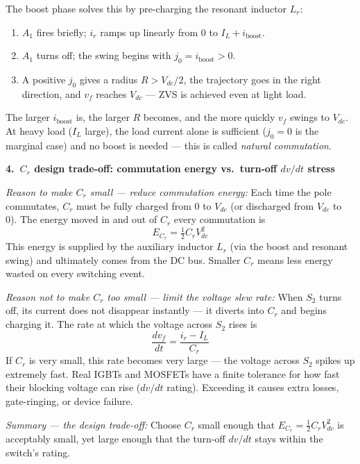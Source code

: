 \documentclass[12pt, a4paper]{article}
\newcommand{\Vdc}{V_{dc}}
\newcommand{\vf}{v_f}
\newcommand{\ir}{i_r}
\newcommand{\IL}{I_L}
\newcommand{\Lr}{L_r}
\newcommand{\Cr}{C_r}
\begin{document}
\begin{physbox}
The boost phase solves this by pre-charging the resonant inductor $\Lr$:
\begin{enumerate}
    \item $A_1$ fires briefly; $\ir$ ramps up linearly from 0 to
          $\IL + i_\text{boost}$.
    \item $A_1$ turns off; the swing begins with
          $j_0 = i_\text{boost} > 0$.
    \item A positive $j_0$ gives a radius $R > \Vdc/2$, the trajectory
          goes in the right direction, and $\vf$ reaches $\Vdc$ — ZVS
          is achieved even at light load.
\end{enumerate}
The larger $i_\text{boost}$ is, the larger $R$ becomes, and the more
quickly $\vf$ swings to $\Vdc$.  At heavy load ($\IL$ large), the load
current alone is sufficient ($j_0 = 0$ is the marginal case) and no
boost is needed — this is called \emph{natural commutation}.

\medskip
\textbf{4.\ $\Cr$ design trade-off: commutation energy vs.\ turn-off $dv/dt$ stress}

\textit{Reason to make $\Cr$ small — reduce commutation energy:}
Each time the pole commutates, $\Cr$ must be fully charged from 0 to
$\Vdc$ (or discharged from $\Vdc$ to 0).
The energy moved in and out of $\Cr$ every commutation is
\begin{equation*}
    E_{\Cr} = \tfrac{1}{2}\Cr\Vdc^2
\end{equation*}
This energy is supplied by the auxiliary inductor $\Lr$ (via the boost
and resonant swing) and ultimately comes from the DC bus.
Smaller $\Cr$ means less energy wasted on every switching event.

\textit{Reason not to make $\Cr$ too small — limit the voltage slew rate:}
When $S_2$ turns off, its current does not disappear instantly — it
diverts into $\Cr$ and begins charging it.
The rate at which the voltage across $S_2$ rises is
\begin{equation*}
    \frac{d\vf}{dt} = \frac{\ir - \IL}{\Cr}
\end{equation*}
If $\Cr$ is very small, this rate becomes very large — the voltage
across $S_2$ spikes up extremely fast.
Real IGBTs and MOSFETs have a finite tolerance for how fast their
blocking voltage can rise ($dv/dt$ rating).
Exceeding it causes extra losses, gate-ringing, or device failure.

\textit{Summary — the design trade-off:}
Choose $\Cr$ small enough that $E_{\Cr} = \frac{1}{2}\Cr\Vdc^2$ is
acceptably small, yet large enough that the turn-off $dv/dt$ stays
within the switch's rating.
\end{physbox}
\end{document}
